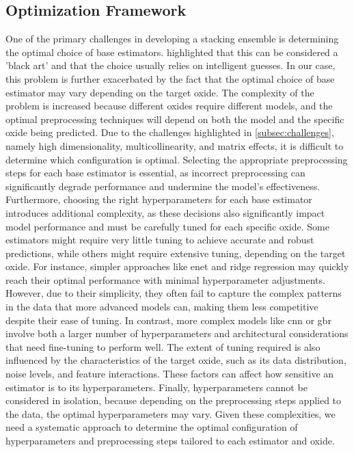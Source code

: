\subsection{Optimization Framework}\label{sec:optimization_framework}
One of the primary challenges in developing a stacking ensemble is determining the optimal choice of base estimators. \citet{wolpertstacked_1992} highlighted that this can be considered a 'black art' and that the choice usually relies on intelligent guesses.
In our case, this problem is further exacerbated by the fact that the optimal choice of base estimator may vary depending on the target oxide.
The complexity of the problem is increased because different oxides require different models, and the optimal preprocessing techniques will depend on both the model and the specific oxide being predicted.
Due to the challenges highlighted in \ref{subsec:challenges}, namely high dimensionality, multicollinearity, and matrix effects, it is difficult to determine which configuration is optimal.
Selecting the appropriate preprocessing steps for each base estimator is essential, as incorrect preprocessing can significantly degrade performance and undermine the model's effectiveness.
Furthermore, choosing the right hyperparameters for each base estimator introduces additional complexity, as these decisions also significantly impact model performance and must be carefully tuned for each specific oxide.
Some estimators might require very little tuning to achieve accurate and robust predictions, while others might require extensive tuning, depending on the target oxide.
For instance, simpler approaches like \gls{enet} and ridge regression may quickly reach their optimal performance with minimal hyperparameter adjustments. However, due to their simplicity, they often fail to capture the complex patterns in the data that more advanced models can, making them less competitive despite their ease of tuning.
In contrast, more complex models like \gls{cnn} or \gls{gbr} involve both a larger number of hyperparameters and architectural considerations that need fine-tuning to perform well.
The extent of tuning required is also influenced by the characteristics of the target oxide, such as its data distribution, noise levels, and feature interactions.
These factors can affect how sensitive an estimator is to its hyperparameters.
Finally, hyperparameters cannot be considered in isolation, because depending on the preprocessing steps applied to the data, the optimal hyperparameters may vary.
Given these complexities, we need a systematic approach to determine the optimal configuration of hyperparameters and preprocessing steps tailored to each estimator and oxide.

